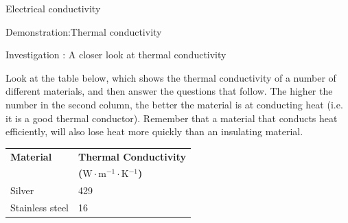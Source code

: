 \begin{iexperiment}{Electrical conductivity}
\begin{gexperiment}{Demonstration:Thermal conductivity}
	\par
\label{m38706*secfhsst!!!underscore!!!id492}
            \begin{gexperiment}{Investigation : A closer look at thermal conductivity}
{            \nopagebreak
      \label{m38706*id66744}Look at the table below, which shows the thermal conductivity of a number of different materials, and then answer the questions that follow. The higher the number in the second column, the better the material is at conducting heat (i.e. it is a good thermal conductor). Remember that a material that conducts heat efficiently, will also lose heat more quickly than an insulating material.\par 
          \begin{table}[H]
        \begin{center}
      \label{m38706*id66753}
    \noindent
      \begin{tabular}{|l|l|}\hline
\textbf{Material} & \textbf{Thermal Conductivity} \\ 
                 &  \textbf{($\mathrm{W}\ensuremath{\cdot}\mathrm{m}{}^{-1}\ensuremath{\cdot}\mathrm{K}{}^{-1}$) } \\ \hline
Silver & 429 \\ \hline
Stainless steel & 16 \\ \hline

\end{tabular}
\end{center}
\end{table}}
\end{gexperiment}
\end{gexperiment}
\end{iexperiment}
